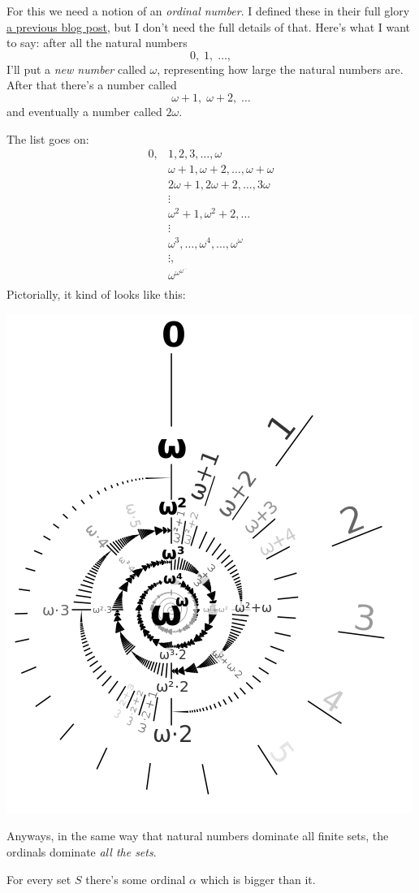 For this we need a notion of an \emph{ordinal number}.
I defined these in their full glory
\href{https://usamo.wordpress.com/2014/11/18/set-theory-part-2-constructing-the-ordinals/}%
{a previous blog post}, but I don't need the full details of that.
Here's what I want to say:
after all the natural numbers 
\[ 0, \; 1, \; \dots, \]
I'll put a \emph{new number} called $\omega$, representing how large the natural numbers are.
After that there's a number called 
\[\omega+1, \; \omega+2, \; \dots \]
and eventually a number called $2\omega$.

The list goes on:
\[
\begin{aligned}
	0, & 1, 2, 3, \dots, \omega \\
	& \omega+1, \omega+2, \dots, \omega+\omega \\
	& 2\omega+1, 2\omega+2, \dots, 3\omega \\
	& \vdots \\
	& \omega^2 + 1, \omega^2+2, \dots \\
	& \vdots \\
	& \omega^3, \dots, \omega^4, \dots, \omega^\omega \\
	& \vdots, \\
	& \omega^{\omega^{\omega^{\dots}}} \\
\end{aligned}
\]
Pictorially, it kind of looks like this:
\begin{center}
	\includegraphics[scale=0.75]{media/500px-Omega-exp-omega-labeled.png}
\end{center}
Anyways, in the same way that natural numbers dominate all finite sets,
the ordinals dominate \emph{all the sets}.
\begin{theorem}
	For every set $S$ there's some ordinal $\alpha$ which is bigger than it.
\end{theorem}

